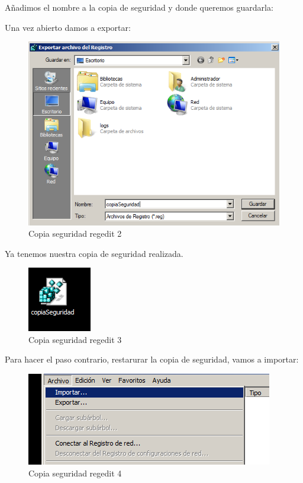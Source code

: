 Añadimos el nombre a la copia de seguridad y donde queremos guardarla:

Una vez abierto damos a exportar:

\begin{figure}[H] %
	\centering
	\includegraphics[scale=0.5]{pics/red2}  %
	\caption{Copia seguridad regedit 2} \label{fig:reg2}
\end{figure}

Ya tenemos nuestra copia de seguridad realizada.

\begin{figure}[H] %
	\centering
	\includegraphics[scale=0.5]{pics/reg3}  %
	\caption{Copia seguridad regedit 3} \label{fig:reg3}
\end{figure}

Para hacer el paso contrario, restarurar la copia de seguridad, vamos a importar:

\begin{figure}[H] %
	\centering
	\includegraphics[scale=0.5]{pics/reg4}  %
	\caption{Copia seguridad regedit 4} \label{fig:reg4}
\end{figure}

